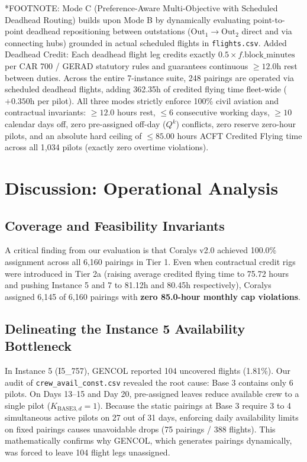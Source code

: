 \documentclass[journal]{IEEEtran}
\begin{document}
\begin{table}[t]
{\begin{tabular}{lrrrrrrrrrrrrrr}
\bottomrule
\end{tabular}%
}
\begin{flushleft}
\footnotesize
*FOOTNOTE: Mode C (Preference-Aware Multi-Objective with Scheduled Deadhead Routing) builds upon Mode B by dynamically evaluating point-to-point deadhead repositioning between outstations ($\text{Out}_1 \to \text{Out}_2$ direct and via connecting hubs) grounded in actual scheduled flights in \texttt{flights.csv}. Added Deadhead Credit: Each deadhead flight leg credits exactly $0.5 \times f.\text{block\_minutes}$ per CAR 700 / GERAD statutory rules and guarantees continuous $\ge 12.0$h rest between duties. Across the entire 7-instance suite, 248 pairings are operated via scheduled deadhead flights, adding 362.35h of credited flying time fleet-wide ($+0.350$h per pilot). All three modes strictly enforce 100\% civil aviation and contractual invariants: $\ge 12.0$ hours rest, $\le 6$ consecutive working days, $\ge 10$ calendar days off, zero pre-assigned off-day ($Q^k$) conflicts, zero reserve zero-hour pilots, and an absolute hard ceiling of $\le 85.00$ hours ACFT Credited Flying time across all 1,034 pilots (exactly zero overtime violations).
\end{flushleft}
\end{table}

\section{Discussion: Operational Analysis}

\subsection{Coverage and Feasibility Invariants}

A critical finding from our evaluation is that Coralys v2.0 achieved 100.0\% assignment across all 6,160 pairings in Tier 1. Even when contractual credit rigs were introduced in Tier 2a (raising average credited flying time to 75.72 hours and pushing Instance 5 and 7 to 81.12h and 80.45h respectively), Coralys assigned 6,145 of 6,160 pairings with \textbf{zero 85.0-hour monthly cap violations}.

\subsection{Delineating the Instance 5 Availability Bottleneck}

In Instance 5 (I5\_757), GENCOL reported 104 uncovered flights (1.81\%). Our audit of \texttt{crew\_avail\_const.csv} revealed the root cause: Base 3 contains only 6 pilots. On Days 13--15 and Day 20, pre-assigned leaves reduce available crew to a single pilot ($K_{\text{BASE3}, d} = 1$). Because the static pairings at Base 3 require 3 to 4 simultaneous active pilots on 27 out of 31 days, enforcing daily availability limits on fixed pairings causes unavoidable drops (75 pairings / 388 flights). This mathematically confirms why GENCOL, which generates pairings dynamically, was forced to leave 104 flight legs unassigned.
\end{document}

